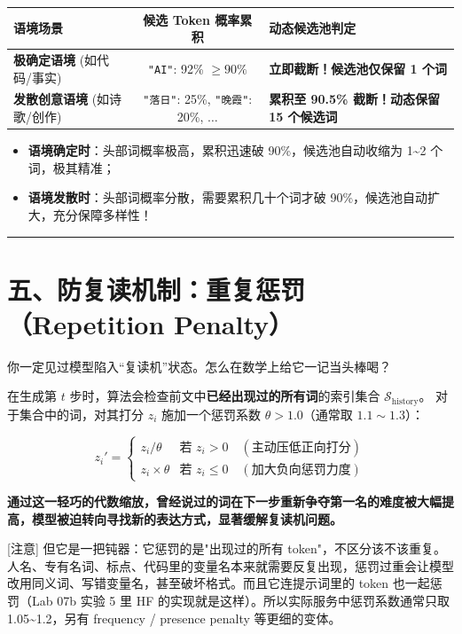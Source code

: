 \begin{center}
\small
\begin{tabularx}{\textwidth}{p{3.5cm} c X}
\toprule
\textbf{语境场景} & \textbf{候选 Token 概率累积} & \textbf{动态候选池判定} \\
\midrule
\textbf{极确定语境} (如代码/事实) & \texttt{"AI"}: 92\% $\ge 90\%$ & \textbf{立即截断！候选池仅保留 1 个词} \\
\midrule
\textbf{发散创意语境} (如诗歌/创作) & \texttt{"落日"}: 25\%, \texttt{"晚霞"}: 20\%, $\dots$ & \textbf{累积至 90.5\% 截断！动态保留 15 个候选词} \\
\bottomrule
\end{tabularx}
\end{center}

\begin{itemize}
  \item \textbf{语境确定时}：头部词概率极高，累积迅速破 90\%，候选池自动收缩为 1\textasciitilde{}2 个词，极其精准；
  \item \textbf{语境发散时}：头部词概率分散，需要累积几十个词才破 90\%，候选池自动扩大，充分保障多样性！
\end{itemize}

\vspace{0.8em}\hrule\vspace{0.8em}

\section{五、防复读机制：重复惩罚（Repetition Penalty）}

你一定见过模型陷入“复读机”状态。怎么在数学上给它一记当头棒喝？

在生成第 $t$ 步时，算法会检查前文中\textbf{已经出现过的所有词}的索引集合 $\mathcal{S}_{\text{history}}$。
对于集合中的词，对其打分 $z_i$ 施加一个惩罚系数 $\theta > 1.0$（通常取 $1.1 \sim 1.3$）：

\[
z_i' = \begin{cases}
z_i / \theta & \text{若 } z_i > 0 \quad (\text{主动压低正向打分}) \\
z_i \times \theta & \text{若 } z_i \le 0 \quad (\text{加大负向惩罚力度})
\end{cases}
\]

\textbf{通过这一轻巧的代数缩放，曾经说过的词在下一步重新争夺第一名的难度被大幅提高，模型被迫转向寻找新的表达方式，显著缓解复读机问题。}

\begin{warningBox}[避坑指南与核心警示]
{}[注意] 但它是一把钝器：它惩罚的是"出现过的所有 token"，不区分该不该重复。人名、专有名词、标点、代码里的变量名本来就需要反复出现，惩罚过重会让模型改用同义词、写错变量名，甚至破坏格式。而且它连提示词里的 token 也一起惩罚（Lab 07b 实验 5 里 HF 的实现就是这样）。所以实际服务中惩罚系数通常只取 1.05\textasciitilde{}1.2，另有 frequency / presence penalty 等更细的变体。
\end{warningBox}

